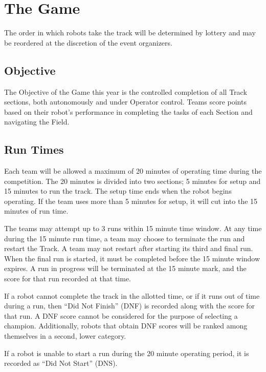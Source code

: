 \section{The Game}
The order in which robots take the track will be determined by lottery and may be reordered at the discretion of the event organizers. 

\subsection{Objective}
The Objective of the Game this year is the controlled completion of all Track sections, both autonomously and under Operator control. Teams score points based on their robot’s performance in completing the tasks of each Section and navigating the Field.

\subsection{Run Times}
Each team will be allowed a maximum of 20 minutes of operating time during the competition. The 20 minutes is divided into two sections; 5 minutes for setup and 15 minutes to run the track. The setup time ends when the robot begins operating. If the team uses more than 5 minutes for setup, it will cut into the 15 minutes of run time. 

The teams may attempt up to 3 runs within 15 minute time window. At any time during the 15 minute run time, a team may choose to terminate the run and restart the Track. A team may not restart after starting its third and final run. When the final run is started, it must be completed before the 15 minute window expires. A run in progress will be terminated at the 15 minute mark, and the score for that run recorded at that time.

If a robot cannot complete the track in the allotted time, or if it runs out of time during a run, then “Did Not Finish” (DNF) is recorded along with the score for that run. A DNF score cannot be considered for the purpose of selecting a champion. Additionally, robots that obtain DNF scores will be ranked among themselves in a second, lower category.

If a robot is unable to start a run during the 20 minute operating period, it is recorded as “Did Not Start” (DNS).


